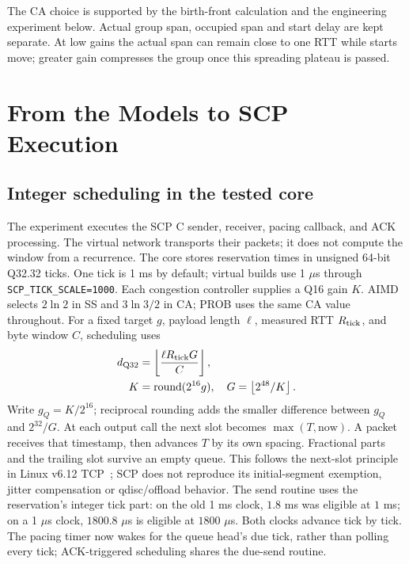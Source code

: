 \documentclass[sigconf,nonacm]{acmart}
\begin{document}
The CA choice is supported by the birth-front calculation and the
engineering experiment below. Actual group span, occupied span and start
delay are kept separate. At low gains the
actual span can remain close to one RTT while starts move; greater gain
compresses the group once this spreading plateau is passed.

\section{From the Models to SCP Execution}
\subsection{Integer scheduling in the tested core}
The experiment executes the SCP C sender, receiver, pacing callback, and ACK processing. The virtual network transports their packets; it does not compute the window from a recurrence. The core stores reservation times in unsigned 64-bit Q32.32 ticks. One tick is 1 ms by default; virtual builds use 1 $\mu$s through \texttt{SCP\_TICK\_SCALE=1000}. Each congestion controller supplies a Q16 gain $K$. AIMD selects $2\ln2$ in SS and $3\ln3/2$ in CA; PROB uses the same CA value throughout. For a fixed target $g$, payload length $\ell$, measured RTT $R_{\rm tick}$, and byte window $C$, scheduling uses
\begin{equation}
\begin{aligned}
 d_{\rm Q32}&=\left\lfloor\frac{\ell R_{\rm tick}G}{C}\right\rfloor,\\
 K&=\operatorname{round}(2^{16}g),\quad G=\left\lfloor 2^{48}/K\right\rfloor.
\end{aligned}
\end{equation}
Write $g_Q=K/2^{16}$; reciprocal rounding adds the smaller difference between $g_Q$ and $2^{32}/G$. At each output call the next slot becomes $\max(T,\mathrm{now})$. A packet receives that timestamp, then advances $T$ by its own spacing. Fractional parts and the trailing slot survive an empty queue. This follows the next-slot principle in Linux v6.12 TCP~\cite{linux}; SCP does not reproduce its initial-segment exemption, jitter compensation or qdisc/offload behavior. The send routine uses the reservation's integer tick part: on the old 1 ms clock, $1.8$ ms was eligible at $1$ ms; on a 1 $\mu$s clock, $1800.8$ $\mu$s is eligible at $1800$ $\mu$s. Both clocks advance tick by tick. The pacing timer now wakes for the queue head's due tick, rather than polling every tick; ACK-triggered scheduling shares the due-send routine.
\end{document}
